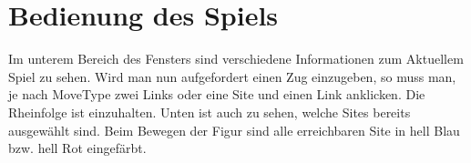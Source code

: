 \documentclass{scrartcl}
\begin{document}
\section*{Bedienung des Spiels}
Im unterem Bereich des Fensters sind verschiedene Informationen zum Aktuellem Spiel zu sehen.
Wird man nun aufgefordert einen Zug einzugeben, so muss man, je nach MoveType zwei Links oder eine Site und einen Link anklicken. Die Rheinfolge ist einzuhalten.
Unten ist auch zu sehen, welche Sites bereits ausgewählt sind. 
Beim Bewegen der Figur sind alle erreichbaren Site in hell Blau bzw. hell Rot eingefärbt.
\end{document}
